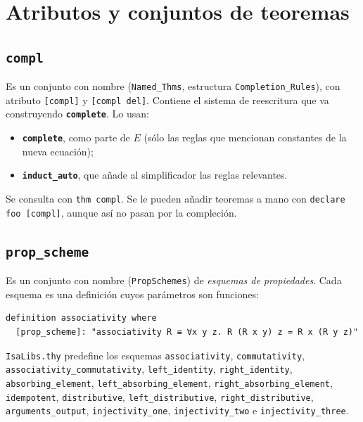 \documentclass[11pt,a4paper]{article}
\newcommand{\isa}[1]{\texttt{#1}}
\newcommand{\cmd}[1]{\textbf{\texttt{#1}}}
\theoremstyle{definition}
\theoremstyle{remark}
\begin{document}
\section{Atributos y conjuntos de teoremas}

\subsection{\texttt{compl}}

Es un conjunto con nombre (\isa{Named\_Thms}, estructura \isa{Completion\_Rules}),
con atributo \isa{[compl]} y \isa{[compl del]}. Contiene el sistema de reescritura
que va construyendo \cmd{complete}. Lo usan:
\begin{itemize}[nosep]
  \item \cmd{complete}, como parte de $E$ (sólo las reglas que mencionan constantes
        de la nueva ecuación);
  \item \cmd{induct\_auto}, que añade al simplificador las reglas relevantes.
\end{itemize}
Se consulta con \isa{thm compl}. Se le pueden añadir teoremas a mano con
\isa{declare foo [compl]}, aunque así no pasan por la compleción.

\subsection{\texttt{prop\_scheme}}
\label{sec:prop_scheme}

Es un conjunto con nombre (\isa{PropSchemes}) de \emph{esquemas de propiedades}.
Cada esquema es una definición cuyos parámetros son funciones:
\begin{lstlisting}
definition associativity where
  [prop_scheme]: "associativity R ≡ ∀x y z. R (R x y) z = R x (R y z)"
\end{lstlisting}
\isa{IsaLibs.thy} predefine los esquemas
\isa{associativity}, \isa{commutativity}, \isa{associativity\_commutativity},
\isa{left\_identity}, \isa{right\_identity}, \isa{absorbing\_element},
\isa{left\_absorbing\_element}, \isa{right\_absorbing\_element}, \isa{idempotent},
\isa{distributive}, \isa{left\_distributive}, \isa{right\_distributive},
\isa{arguments\_output}, \isa{injectivity\_one}, \isa{injectivity\_two} e
\isa{injectivity\_three}.
\end{document}
